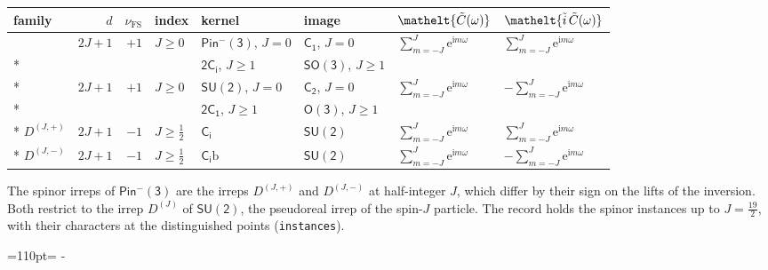 \documentclass[10pt,a4paper]{article}
\makeatletter
\def\grouprule#1#2{\noalign{\marks\LTgroupmarks{\the\belowrulesep}\nobreak\vskip#1%
  \vskip\aboverulesep}\multispan\LT@cols\unskip{\leaders\hrule\@height#2\hfill\kern\z@}\cr
  \noalign{\penalty\LTrulebreak\vskip\belowrulesep\global\@lastruleclass\z@}}
\newcommand{\needspace}[1]{\par\penalty-100\begingroup\dimen0=#1\relax\dimen2=\pagegoal
  \advance\dimen2-\pagetotal\ifdim\dimen0>\dimen2\relax\ifdim\dimen2>0pt\vfil\break\fi\fi
  \endgroup}
\numberwithin{equation}{section}
\newcommand{\eltfont}[1]{{\let\sigma\eltsigma\mathelt{#1}}}
\newcommand{\grp}[1]{\mathsf{#1}}
\newcommand{\comp}[1]{\eltfont{#1}}
\newcommand{\iunit}{\mathrm{i}}
\newcommand{\expe}{\mathrm{e}}
\newcommand{\irrJ}[1]{D^{(#1)}}
\newcommand{\irrJp}[2]{D^{(#1,#2)}}
\newcommand{\fsind}{\nu_{\mathrm{FS}}}
\newcommand{\secondclass}{\mathrm{b}}
\newcommand{\lift}[1]{\tilde{#1}}
\makeatother
\begin{document}
{\small{\renewcommand{\arraystretch}{1.3}\begin{longtable}{@{}lrrlllll@{}}\toprule
family & $d$ & $\fsind$ & index & kernel & image & $\comp{\lift{C}(\omega)}$ & $\comp{\lift{i}\,\lift{C}(\omega)}$\\\midrule\endhead
\bottomrule\endfoot\endlastfoot
\multirow{2}{*}{$\irrJp{J}{+}$} & \multirow{2}{*}{$2J+1$} & \multirow{2}{*}{$+1$} & \multirow{2}{*}{$J \ge 0$} & \href{Pinminus3.pdf}{$\grp{Pin^{-}(3)}$}, $J = 0$ & \href{../../../rotation/data/pdf/C1.pdf}{$\grp{C_{1}}$}, $J = 0$ & \multirow{2}{*}{$\sum_{m=-J}^{J}\expe^{\iunit m\omega}$} & \multirow{2}{*}{$\sum_{m=-J}^{J}\expe^{\iunit m\omega}$}\\*
 &  &  &  & \href{2S2.pdf}{$\grp{2C_{i}}$}, $J \ge 1$ & \href{../../../rotation/data/pdf/SO3.pdf}{$\grp{SO(3)}$}, $J \ge 1$ &  & \\*
\multirow{2}{*}{$\irrJp{J}{-}$} & \multirow{2}{*}{$2J+1$} & \multirow{2}{*}{$+1$} & \multirow{2}{*}{$J \ge 0$} & \href{SU2.pdf}{$\grp{SU(2)}$}, $J = 0$ & \href{../../../rotation/data/pdf/C2.pdf}{$\grp{C_{2}}$}, $J = 0$ & \multirow{2}{*}{$\sum_{m=-J}^{J}\expe^{\iunit m\omega}$} & \multirow{2}{*}{$-\sum_{m=-J}^{J}\expe^{\iunit m\omega}$}\\*
 &  &  &  & \href{2C1.pdf}{$\grp{2C_{1}}$}, $J \ge 1$ & \href{../../../rotation/data/pdf/O3.pdf}{$\grp{O(3)}$}, $J \ge 1$ &  & \\*
\grouprule{0pt}{\lightrulewidth}
$\irrJp{J}{+}$ & $2J+1$ & $-1$ & $J \ge \tfrac{1}{2}$ & \href{S2.pdf}{$\grp{C_{i}}$} & \href{SU2.pdf}{$\grp{SU(2)}$} & $\sum_{m=-J}^{J}\expe^{\iunit m\omega}$ & $\sum_{m=-J}^{J}\expe^{\iunit m\omega}$\\*
$\irrJp{J}{-}$ & $2J+1$ & $-1$ & $J \ge \tfrac{1}{2}$ & \href{S2b.pdf}{$\grp{C_{i}}\secondclass$} & \href{SU2.pdf}{$\grp{SU(2)}$} & $\sum_{m=-J}^{J}\expe^{\iunit m\omega}$ & $-\sum_{m=-J}^{J}\expe^{\iunit m\omega}$\\
\bottomrule\end{longtable}}}
The spinor irreps of $\grp{Pin^{-}(3)}$ are the irreps $\irrJp{J}{+}$ and $\irrJp{J}{-}$ at half-integer $J$, which differ by their sign on the lifts of the inversion. Both restrict to the irrep $\irrJ{J}$ of $\grp{SU(2)}$, the pseudoreal irrep of the spin-$J$ particle.
The record holds the spinor instances up to $J = \tfrac{19}{2}$, with their characters at the distinguished points (\texttt{instances}).
\needspace{110pt}
\end{document}
